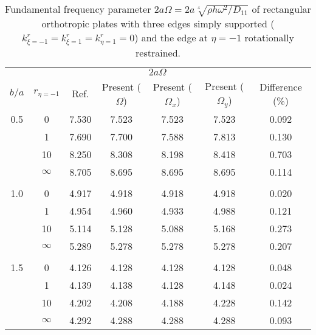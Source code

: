 \documentclass[preprint,12pt,number]{elsarticle}
\begin{document}
\begin{table}[!htbp]  
\centering
\caption{Fundamental frequency parameter $2a\Omega = 2a\sqrt[4]{\rho h \omega^2/D_{11}}$ of rectangular orthotropic plates with three edges simply supported ($k^r_{\xi=-1} = k^r_{\xi=1} = k^r_{\eta=1} = 0$) and the edge at $\eta = -1$ rotationally restrained.}
\begin{tabular}{c c c c c c c }
	\toprule
	\multicolumn{2}{c}{} & \multicolumn{4}{c}{$2a\Omega$} & \\ 
	\cmidrule(lr){3-7}
	$b/a$ & $r_{\eta=-1}$ & Ref.\Citealp{zhang2019new} & Present ($\Omega$) & Present ($\Omega_x$) & Present ($\Omega_y$) & Difference (\%) \\ 
	\midrule
	0.5 & 0         & 7.530 & 7.523 & 7.523 & 7.523 & 0.092 \\ 
	& 1         & 7.690 & 7.700 & 7.588 & 7.813 & 0.130 \\ 
	& 10        & 8.250 & 8.308 & 8.198 & 8.418 & 0.703 \\ 
	& $\infty$  & 8.705 & 8.695 & 8.695 & 8.695 & 0.114 \\ 
	\\
	1.0 & 0         & 4.917 & 4.918 & 4.918 & 4.918 & 0.020 \\ 
	& 1         & 4.954 & 4.960 & 4.933 & 4.988 & 0.121 \\ 
	& 10        & 5.114 & 5.128 & 5.088 & 5.168 & 0.273 \\ 
	& $\infty$  & 5.289 & 5.278 & 5.278 & 5.278 & 0.207 \\ 
	\\
	1.5 & 0         & 4.126 & 4.128 & 4.128 & 4.128 & 0.048 \\ 
	& 1         & 4.139 & 4.138 & 4.128 & 4.148 & 0.024 \\ 
	& 10        & 4.202 & 4.208 & 4.188 & 4.228 & 0.142 \\ 
	& $\infty$  & 4.292 & 4.288 & 4.288 & 4.288 & 0.093 \\ 
	\bottomrule
\end{tabular}
\label{tab:oth2}
\end{table}

\FloatBarrier
\end{document}
